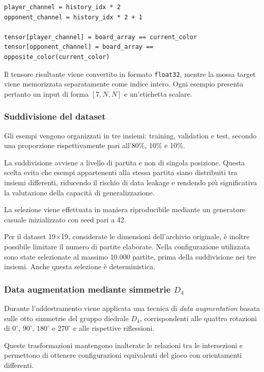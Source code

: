 \begin{verbatim}
player_channel = history_idx * 2
opponent_channel = history_idx * 2 + 1

tensor[player_channel] = board_array == current_color
tensor[opponent_channel] = board_array == opposite_color(current_color)
\end{verbatim}

Il tensore risultante viene convertito in formato \texttt{float32}, mentre la mossa target viene memorizzata separatamente come indice intero. Ogni esempio presenta pertanto un input di forma \([7,N,N]\) e un'etichetta scalare.

\subsubsection{Suddivisione del dataset}

Gli esempi vengono organizzati in tre insiemi: training, validation e test, secondo una proporzione rispettivamente pari all'80\%, 10\% e 10\%.

La suddivisione avviene a livello di partita e non di singola posizione. Questa scelta evita che esempi appartenenti alla stessa partita siano distribuiti tra insiemi differenti, riducendo il rischio di data leakage e rendendo più significativa la valutazione della capacità di generalizzazione.

La selezione viene effettuata in maniera riproducibile mediante un generatore casuale inizializzato con seed pari a 42.

Per il dataset 19$\times$19, considerate le dimensioni dell'archivio originale, è inoltre possibile limitare il numero di partite elaborate. Nella configurazione utilizzata sono state selezionate al massimo 10.000 partite, prima della suddivisione nei tre insiemi. Anche questa selezione è deterministica.

\subsubsection{Data augmentation mediante simmetrie \texorpdfstring{\(D_4\)}{D4}}

Durante l'addestramento viene applicata una tecnica di \textit{data augmentation} basata sulle otto simmetrie del gruppo diedrale \(D_4\), corrispondenti alle quattro rotazioni di \(0^\circ\), \(90^\circ\), \(180^\circ\) e \(270^\circ\) e alle rispettive riflessioni.

Queste trasformazioni mantengono inalterate le relazioni tra le intersezioni e permettono di ottenere configurazioni equivalenti del gioco con orientamenti differenti.

